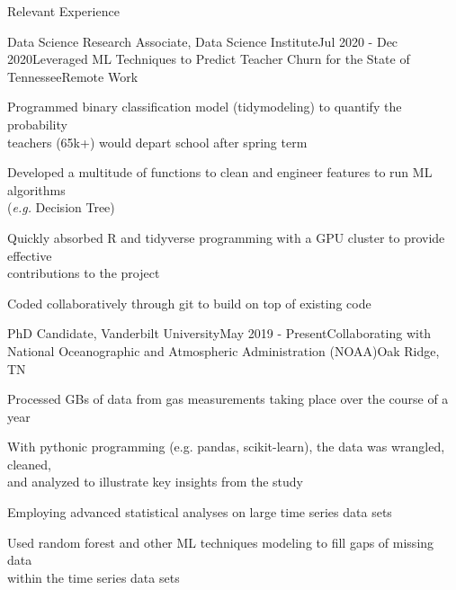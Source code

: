 \documentclass{resume} %
\begin{document}
\begin{rSection}{Relevant Experience}

\begin{rSubsection}{Data Science Research Associate, Data Science Institute}{Jul 2020 - Dec 2020}{Leveraged ML Techniques to Predict Teacher Churn for the State of Tennessee}{Remote Work} 
\item {Programmed binary classification model (tidymodeling) to quantify the probability \\ teachers (65k+) would depart school after spring term}
\item {Developed a multitude of functions to clean and engineer features to run ML algorithms \\ (\emph{e.g.} Decision Tree)}
\item {Quickly absorbed R and tidyverse programming with a GPU cluster to provide effective \\ contributions to the project}
\item {Coded collaboratively through git to build on top of existing code}

\end{rSubsection} 


\begin{rSubsection}{PhD Candidate, Vanderbilt University}{May 2019 - Present}{Collaborating with National Oceanographic and Atmospheric Administration (NOAA)}{Oak Ridge, TN}
\item {Processed GBs of data from gas measurements taking place over the course of a year}
\item {With pythonic programming (e.g. pandas, scikit-learn), the data was wrangled, cleaned, \\ and analyzed to illustrate key insights from the study}
\item {Employing advanced statistical analyses on large time series data sets}
\item {Used random forest and other ML techniques modeling to fill gaps of missing data \\ within the time series data sets}

\end{rSubsection}



\end{rSection}
\end{document}
